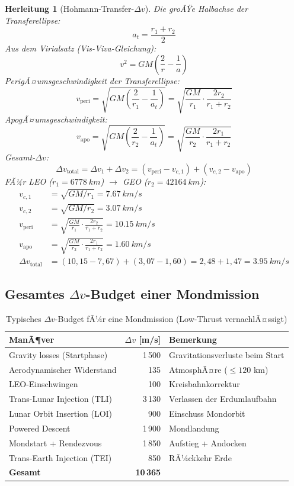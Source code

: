﻿\documentclass[12pt,a4paper]{article}
\newtheorem{herleitung}{Herleitung}[section]
\newcommand{\Dv}{\Delta v}
\begin{document}
\begin{herleitung}[Hohmann-Transfer-$\Dv$]
Die groÃŸe Halbachse der Transferellipse:
\[
  a_t = \frac{r_1 + r_2}{2}
\]
Aus dem Virialsatz (Vis-Viva-Gleichung):
\[
  v^2 = GM\left(\frac{2}{r} - \frac{1}{a}\right)
\]
PerigÃ¤umsgeschwindigkeit der Transferellipse:
\[
  v_{\mathrm{peri}} = \sqrt{GM\left(\frac{2}{r_1} - \frac{1}{a_t}\right)}
  = \sqrt{\frac{GM}{r_1}\cdot\frac{2r_2}{r_1+r_2}}
\]
ApogÃ¤umsgeschwindigkeit:
\[
  v_{\mathrm{apo}} = \sqrt{GM\left(\frac{2}{r_2} - \frac{1}{a_t}\right)}
  = \sqrt{\frac{GM}{r_2}\cdot\frac{2r_1}{r_1+r_2}}
\]
Gesamt-$\Dv$:
\[
  \boxed{\Dv_{\mathrm{total}} = \Dv_1 + \Dv_2
    = \left(v_{\mathrm{peri}} - v_{c,1}\right)
    + \left(v_{c,2} - v_{\mathrm{apo}}\right)}
\]
FÃ¼r LEO ($r_1 = \SI{6778}{km}$) $\to$ GEO ($r_2 = \SI{42164}{km}$):
\begin{align*}
  v_{c,1} &= \sqrt{GM/r_1} = \SI{7.67}{km/s}\\
  v_{c,2} &= \sqrt{GM/r_2} = \SI{3.07}{km/s}\\
  v_{\mathrm{peri}} &= \sqrt{\frac{GM}{r_1}\cdot\frac{2r_2}{r_1+r_2}}
    = \SI{10.15}{km/s}\\
  v_{\mathrm{apo}} &= \sqrt{\frac{GM}{r_2}\cdot\frac{2r_1}{r_1+r_2}}
    = \SI{1.60}{km/s}\\
  \Dv_{\mathrm{total}} &= (10{,}15 - 7{,}67) + (3{,}07 - 1{,}60)
    = 2{,}48 + 1{,}47 = \SI{3.95}{km/s}
\end{align*}
\end{herleitung}

\subsection{Gesamtes $\Dv$-Budget einer Mondmission}

\begin{table}[H]
\centering
\caption{Typisches $\Dv$-Budget fÃ¼r eine Mondmission (Low-Thrust vernachlÃ¤ssigt)}
\label{tab:dv_mond}
\begin{tabular}{lrl}
\toprule
\textbf{ManÃ¶ver} & \textbf{$\Dv$ [m/s]} & \textbf{Bemerkung}\\
\midrule
Gravity losses (Startphase)       & 1\,500 & Gravitationsverluste beim Start\\
Aerodynamischer Widerstand        &   135  & AtmosphÃ¤re ($\leq 120$ km)\\
LEO-Einschwingen                  &   100  & Kreisbahnkorrektur\\
Trans-Lunar Injection (TLI)       & 3\,130 & Verlassen der Erdumlaufbahn\\
Lunar Orbit Insertion (LOI)       &   900  & Einschuss Mondorbit\\
Powered Descent                   & 1\,900 & Mondlandung\\
Mondstart + Rendezvous            & 1\,850 & Aufstieg + Andocken\\
Trans-Earth Injection (TEI)       &   850  & RÃ¼ckkehr Erde\\
\midrule
\textbf{Gesamt}                   & \textbf{10\,365} & \\
\bottomrule
\end{tabular}
\end{table}
\end{document}
